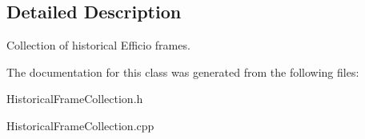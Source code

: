 \subsection{Detailed Description}
Collection of historical Efficio frames. 

The documentation for this class was generated from the following files\+:\begin{DoxyCompactItemize}
\item 
Historical\+Frame\+Collection.\+h\item 
Historical\+Frame\+Collection.\+cpp\end{DoxyCompactItemize}

